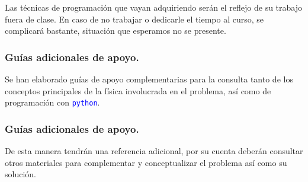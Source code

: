 \documentclass[12pt]{beamer}
\newcommand{\python}{\texttt{python}}
\newcommand{\textoazul}[1]{\textcolor{blue}{#1}}
\begin{document}
\begin{frame}
Las técnicas de programación que vayan adquiriendo serán el reflejo de su trabajo fuera de clase. En caso de no trabajar o dedicarle el tiempo al curso, se complicará bastante, situación que esperamos no se presente.
\end{frame}
\begin{frame}
\frametitle{Guías adicionales de apoyo.}
Se han elaborado guías de apoyo complementarias para la consulta tanto de los conceptos principales de la física involucrada en el problema, así como de programación con \textoazul{\python}.
\end{frame}
\begin{frame}
\frametitle{Guías adicionales de apoyo.}
De esta manera tendrán una referencia adicional, por su cuenta deberán consultar otros materiales para complementar y conceptualizar el problema así como su solución.
\end{frame}
\end{document}
